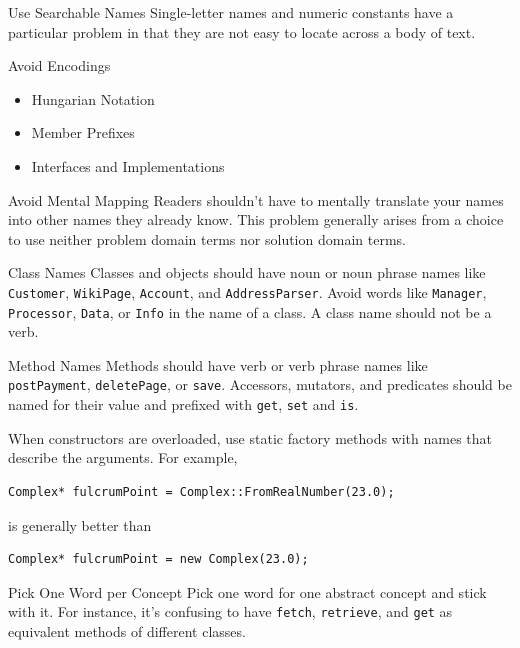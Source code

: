 \documentclass{beamer}
\begin{document}
\begin{frame}{Use Searchable Names}
Single-letter names and numeric constants have a particular problem in that they are not
easy to locate across a body of text.
\end{frame}

\begin{frame}{Avoid Encodings}
\begin{itemize}
  \item Hungarian Notation
  \item Member Prefixes
  \item Interfaces and Implementations
\end{itemize}
\end{frame}

\begin{frame}{Avoid Mental Mapping}
Readers shouldn’t have to mentally translate your names into other names they
already know. This problem generally arises from a choice to use neither problem
domain terms nor solution domain terms.
\end{frame}

\begin{frame}[fragile]{Class Names}
Classes and objects should have noun or noun phrase names like
\lstinline{Customer}, \lstinline{WikiPage}, \lstinline{Account}, and
\lstinline{AddressParser}. Avoid words like \lstinline{Manager},
\lstinline{Processor}, \lstinline{Data}, or \lstinline{Info} in the name of a
class. A class name should not be a verb.
\end{frame}

\begin{frame}[fragile]{Method Names}
Methods should have verb or verb phrase names like \lstinline{postPayment},
\lstinline{deletePage}, or \lstinline{save}. Accessors, mutators, and predicates
should be named for their value and prefixed with \lstinline{get},
\lstinline{set} and \lstinline{is}.


When constructors are overloaded, use static factory methods with names that
describe the arguments. For example,
\begin{lstlisting}
Complex* fulcrumPoint = Complex::FromRealNumber(23.0);
\end{lstlisting}
is generally better than
\begin{lstlisting}
Complex* fulcrumPoint = new Complex(23.0);
\end{lstlisting}
\end{frame}

\begin{frame}{Pick One Word per Concept}
Pick one word for one abstract concept and stick with it. For instance, it’s
confusing to have \lstinline{fetch}, \lstinline{retrieve}, and \lstinline{get}
as equivalent methods of different classes.
\end{frame}
\end{document}

